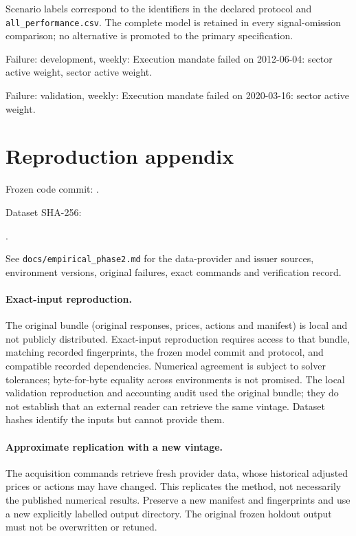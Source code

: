 \documentclass[11pt,a4paper]{article}
\begin{document}
\noindent Scenario labels correspond to the identifiers in the declared protocol and \texttt{all\_performance.csv}. The complete model is retained in every signal-omission comparison; no alternative is promoted to the primary specification.

Failure: development, weekly: Execution mandate failed on 2012-06-04: sector active weight, sector active weight.


Failure: validation, weekly: Execution mandate failed on 2020-03-16: sector active weight.


\clearpage\section{Reproduction appendix}\label{app-reproduction}

Frozen code commit: .


Dataset SHA-256:\par{}.



See \texttt{docs/empirical\_phase2.md} for the data-provider and issuer sources,
environment versions, original failures, exact commands and verification record.
\paragraph{Exact-input reproduction.}
The original bundle (original responses, prices, actions and manifest) is local
and not publicly distributed. Exact-input reproduction requires access to that
bundle, matching recorded fingerprints, the frozen model commit and protocol,
and compatible recorded dependencies. Numerical agreement is subject to solver
tolerances; byte-for-byte equality across environments is not promised.
The local validation reproduction and accounting audit used the original bundle;
they do not establish that an external reader can retrieve the same vintage.
Dataset hashes identify the inputs but cannot provide them.

\paragraph{Approximate replication with a new vintage.}
The acquisition commands retrieve fresh provider data, whose historical adjusted
prices or actions may have changed. This replicates the method, not necessarily
the published numerical results. Preserve a new manifest and fingerprints and
use a new explicitly labelled output directory. The original frozen holdout
output must not be overwritten or retuned.
\end{document}
